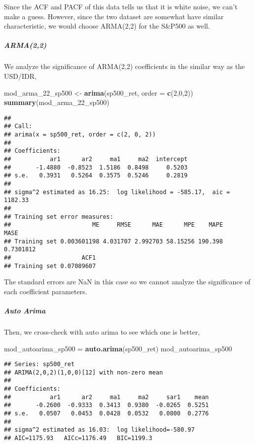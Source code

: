 \documentclass[]{article}
\newenvironment{Shaded}{\begin{snugshade}}{\end{snugshade}}
\newcommand{\KeywordTok}[1]{\textcolor[rgb]{0.13,0.29,0.53}{\textbf{#1}}}
\newcommand{\DataTypeTok}[1]{\textcolor[rgb]{0.13,0.29,0.53}{#1}}
\newcommand{\DecValTok}[1]{\textcolor[rgb]{0.00,0.00,0.81}{#1}}
\newcommand{\StringTok}[1]{\textcolor[rgb]{0.31,0.60,0.02}{#1}}
\newcommand{\NormalTok}[1]{#1}
\let\oldsubparagraph\subparagraph
\renewcommand{\subparagraph}[1]{\oldsubparagraph{#1}\mbox{}}
\begin{document}
Since the ACF and PACF of this data tells us that it is white noise, we
can't make a guess. However, since the two dataset are somewhat have
similar characteristic, we would choose ARMA(2,2) for the S\&P500 as
well.

\subparagraph{ARMA(2,2)}\label{arma22}

We analyze the significance of ARMA(2,2) coefficients in the similar way
as the USD/IDR,

\begin{Shaded}
\begin{Highlighting}[]
\NormalTok{mod_arma_22_sp500 <-}\StringTok{ }\KeywordTok{arima}\NormalTok{(sp500_ret, }\DataTypeTok{order =} \KeywordTok{c}\NormalTok{(}\DecValTok{2}\NormalTok{,}\DecValTok{0}\NormalTok{,}\DecValTok{2}\NormalTok{)) }
\KeywordTok{summary}\NormalTok{(mod_arma_22_sp500)}
\end{Highlighting}
\end{Shaded}

\begin{verbatim}
## 
## Call:
## arima(x = sp500_ret, order = c(2, 0, 2))
## 
## Coefficients:
##           ar1      ar2     ma1     ma2  intercept
##       -1.4880  -0.8523  1.5186  0.8498     0.5203
## s.e.   0.3931   0.5264  0.3575  0.5246     0.2819
## 
## sigma^2 estimated as 16.25:  log likelihood = -585.17,  aic = 1182.33
## 
## Training set error measures:
##                       ME     RMSE      MAE      MPE    MAPE      MASE
## Training set 0.003601198 4.031707 2.992703 58.15256 190.398 0.7301812
##                    ACF1
## Training set 0.07089607
\end{verbatim}

The standard errors are NaN in this case so we cannot analyze the
significance of each coefficient parameters.

\subparagraph{Auto Arima}\label{auto-arima-1}

Then, we cross-check with auto arima to see which one is better,

\begin{Shaded}
\begin{Highlighting}[]
\NormalTok{mod_autoarima_sp500 =}\StringTok{ }\KeywordTok{auto.arima}\NormalTok{(sp500_ret)}
\NormalTok{mod_autoarima_sp500}
\end{Highlighting}
\end{Shaded}

\begin{verbatim}
## Series: sp500_ret 
## ARIMA(2,0,2)(1,0,0)[12] with non-zero mean 
## 
## Coefficients:
##           ar1      ar2     ma1     ma2     sar1    mean
##       -0.2600  -0.9333  0.3413  0.9380  -0.0265  0.5251
## s.e.   0.0507   0.0453  0.0428  0.0532   0.0800  0.2776
## 
## sigma^2 estimated as 16.03:  log likelihood=-580.97
## AIC=1175.93   AICc=1176.49   BIC=1199.3
\end{verbatim}
\end{document}
